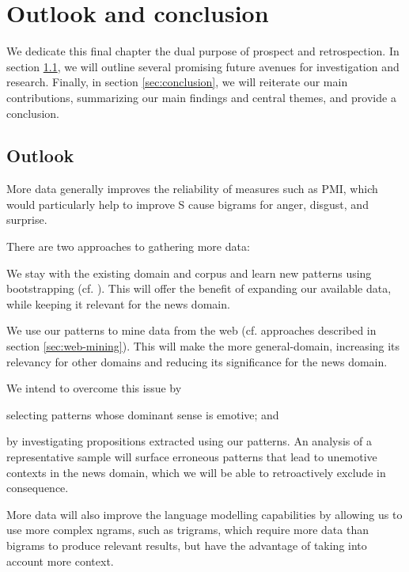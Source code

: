 
\chapter{Outlook and conclusion} %

\label{ch:outlook-conclusion}

We dedicate this final chapter the dual purpose of prospect and retrospection. In section \ref{sec:outlook}, we will outline several promising future avenues for investigation and research. Finally, in section \ref{sec:conclusion}, we will reiterate our main contributions, summarizing our main findings and central themes, and provide a conclusion.

\section{Outlook} \label{sec:outlook}

More data generally improves the reliability of measures such as PMI, which would particularly help to improve S cause bigrams for anger, disgust, and surprise. \begin{inparaenum} There are two approaches to gathering more data: \item We stay with the existing domain and corpus and learn new patterns using bootstrapping (cf.  \cite{harvesting_ontologizing}). This will offer the benefit of expanding our available data, while keeping it relevant for the news domain. \item We use our patterns to mine data from the web  (cf. approaches described in section \ref{sec:web-mining}). This will make the more general-domain, increasing its relevancy for other domains and reducing its significance for the news domain. \end{inparaenum}

\begin{inparaenum} We intend to overcome this issue by \item selecting patterns whose dominant sense is emotive; and \item by investigating propositions extracted using our patterns. An analysis of a representative sample will surface erroneous patterns that lead to unemotive contexts in the news domain, which we will be able to retroactively exclude in consequence. \end{inparaenum}

More data will also improve the language modelling capabilities by allowing us to use more complex ngrams, such as trigrams, which require more data than bigrams to produce relevant results, but have the advantage of taking into account more context.

